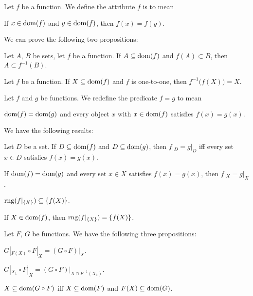 \documentclass{article}
\begin{document}
\begin{definition}
Let $f$ be a function. We define the attribute $f$ is 
to mean
\begin{defn}
\item If $x\in\operatorname{dom}(f)$ and $y\in\operatorname{dom}(f)$, then $f(x)=f(y)$.
\end{defn}
\end{definition}

We can prove the following two propositions:
\begin{thm}
\item\label{funct1:93} Let $A$, $B$ be sets, let $f$ be a function.
  If $A\subseteq\operatorname{dom}(f)$ and $f(A)\subset B$, then $A\subset f^{-1}(B)$.
\item\label{funct1:94} Let $f$ be a function. If $X\subseteq\operatorname{dom}(f)$ and
  $f$ is one-to-one, then $f^{-1}\bigl(f(X)\bigr)=X$.
\end{thm}

\begin{definition}
Let $f$ and $g$ be functions. We redefine the predicate $f=g$ to mean
\begin{defn}
\item $\operatorname{dom}(f)=\operatorname{dom}(g)$ and every object $x$ with $x\in\operatorname{dom}(f)$
  satisfies $f(x)=g(x)$.
\end{defn}
\end{definition}

We have the following results:
\begin{thm}
\item\label{funct1:95} Let $D$ be a set. If $D\subseteq\operatorname{dom}(f)$ and
  $D\subseteq\operatorname{dom}(g)$, then $f|_{D}=g|_{D}$ iff every set $x\in D$
  satisfies $f(x)=g(x)$.
\item\label{funct1:96} If $\operatorname{dom}(f)=\operatorname{dom}(g)$ and every set $x\in X$
  satisfies $f(x)=g(x)$, then $f|_{X}=g|_{X}$.
\item\label{funct1:97} $\operatorname{rng}(f|_{\{X\}})\subseteq\{f(X)\}$.
\item\label{funct1:98} If $X\in\operatorname{dom}(f)$, then $\operatorname{rng}(f|_{\{X\}})=\{f(X)\}$.
\end{thm}

Let $F$, $G$ be functions. We have the following three propositions:
\begin{thm}
\item\label{funct1:99} $G|_{F(X)}\circ F|_{X}=(G\circ F)|_{X}$.
\item\label{funct1:100} $G|_{X_{1}}\circ F|_{X}=(G\circ F)|_{X\cap F^{-1}(X_{1})}$.
\item\label{funct1:101} $X\subseteq\operatorname{dom}(G\circ F)$ iff $X\subseteq\operatorname{dom}(F)$
  and $F(X)\subseteq\operatorname{dom}(G)$.
\end{thm}
\end{document}
